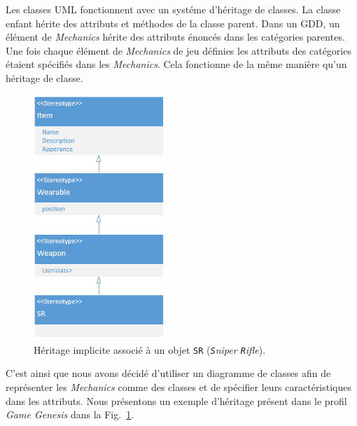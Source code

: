 
Les classes UML fonctionnent avec un systéme d'héritage de classes.
La classe enfant hérite des attributs et méthodes de la classe parent.
Dans un GDD, un \'el\'ement de \emph{Mechanics} hérite des attributs énoncés dans les catégories parentes.
%
%
Une fois chaque \'el\'ement de \emph{Mechanics} de jeu définies les attributs des catégories étaient spécifiés dans les \emph{Mechanics}.
Cela fonctionne de la même manière qu'un héritage de classe.


\begin{figure}
    \centering
    \includegraphics[width=5cm]{10_img/chap5/heritage.PNG} 
    \caption{Héritage implicite associ\'e à un objet \texttt{SR} (\emph{\texttt{S}niper \texttt{R}ifle}).}
    \label{fig.herit}
\end{figure}

%
C'est ainsi que nous avons décidé d'utiliser un diagramme de classes afin de représenter les \emph{Mechanics} comme des classes et de spécifier leurs caractéristiques dans les attributs.
Nous présentons un exemple d'héritage présent dans le profil \emph{Game Genesis} dans la Fig.~\ref{fig.herit}.

